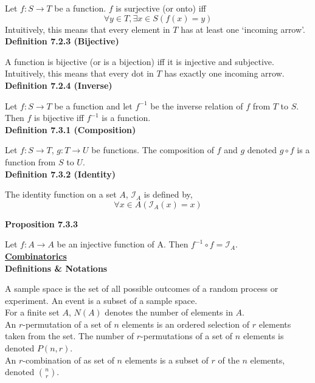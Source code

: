 \documentclass[a4paper]{article}
\newcommand{\heading}[1]{{\small\underline{\textbf{#1}}}}
\newcommand{\subheading}[1]{{\scriptsize\textbf{#1}}}
\begin{document}
\begin{multicols*}{4}
Let $f : S \rightarrow T$ be a function. $f$ is surjective (or onto) iff
$$\forall y \in T, \exists x \in S (f(x) = y)$$
Intuitively, this means that every element in $T$ has at least one `incoming
arrow'.\\

\subheading{Definition 7.2.3 (Bijective)}

A function is bijective (or is a bijection) iff it is injective and
subjective. Intuitively, this means that every dot in $T$ has exactly one
incoming arrow.\\

\subheading{Definition 7.2.4 (Inverse)}

Let $f : S \rightarrow T$ be a function and let $f^{-1}$ be the inverse relation
of $f$ from $T$ to $S$. Then $f$ is bijective iff $f^{-1}$ is a function.\\

\subheading{Definition 7.3.1 (Composition)}

Let $f : S \rightarrow T$, $g: T \rightarrow U$ be functions. The composition of
$f$ and $g$ denoted $g \circ f$ is a function from $S$ to $U$.\\

\subheading{Definition 7.3.2 (Identity)}

The identity function on a set $A$, $\mathcal{I}_A$ is defined by,
$$\forall x \in A(\mathcal{I}_A(x) = x)$$

\subheading{Proposition 7.3.3}

Let $f : A \rightarrow A$ be an injective function of A. Then $f^{-1} \circ f =
\mathcal{I}_A$.\\

\heading{Combinatorics}\\

\subheading{Definitions \& Notations}

A sample space is the set of all possible outcomes of a random process or
experiment. An event is a subset of a sample space.\\

For a finite set $A$, $N(A)$ denotes the number of elements in $A$.\\

An $r$-permutation of a set of $n$ elements is an ordered selection of $r$
elements taken from the set. The number of $r$-permutations of a set of $n$
elements is denoted $P(n, r)$.\\

An $r$-combination of as set of $n$ elements is a subset of $r$ of the $n$
elements, denoted $\binom{n}{r}$.\\


\end{multicols*}
\end{document}
